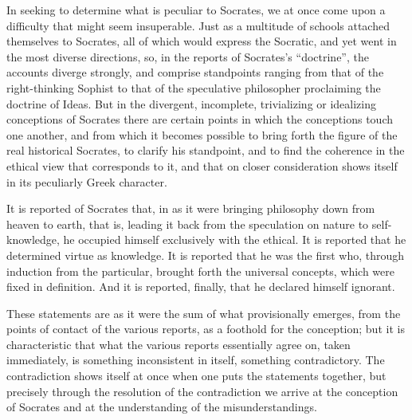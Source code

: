 In seeking to determine what is peculiar to Socrates,
we at once come upon a difficulty that might seem insuperable. Just as a multitude
of schools attached themselves to Socrates, all of which would express the Socratic, and yet went
in the most diverse directions, so, in the reports of
Socrates's ``doctrine'', the accounts diverge strongly, and comprise standpoints ranging from that of the right-thinking Sophist to that of the speculative philosopher proclaiming the doctrine of Ideas. But in the divergent, incomplete, trivializing or idealizing conceptions of Socrates there are certain points in which
the conceptions touch one another, and from which it becomes
possible to bring forth the figure of the real historical Socrates,
to clarify his standpoint, and to find the coherence in
the ethical view that corresponds to it, and that on closer consideration shows itself in its peculiarly Greek character.

It is reported of Socrates that, in as it were bringing
philosophy down from heaven to earth, that is, leading it back from the speculation on nature to self-knowledge, he occupied himself exclusively with the ethical. It is reported that he
determined virtue as knowledge. It is reported that he was the first
who, through induction from the particular, brought forth the universal
concepts, which were fixed in definition. And it is reported, finally, that he declared himself ignorant.

These statements are as it were the sum of what provisionally emerges, from the points of contact of the various reports, as a foothold for the conception; but it is characteristic that what
the various reports essentially agree on, taken
immediately, is something inconsistent in itself, something contradictory. The contradiction shows itself at once when one puts the statements together,
but precisely through the resolution of the contradiction we arrive at the conception of Socrates and at the understanding of the misunderstandings.

